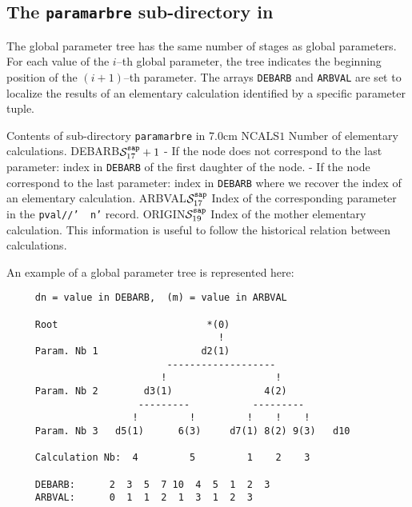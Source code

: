 \subsection{The {\tt paramarbre} sub-directory in }\label{sect:sapdirarbre}

The global parameter tree has the same number of stages as global parameters. For each value of
the $i$--th global parameter, the tree indicates the beginning position of the $(i+1)$--th parameter.
The arrays {\tt DEBARB} and {\tt ARBVAL} are set to localize the results of an elementary calculation
identified by a specific parameter tuple.

\begin{DescriptionEnregistrement}{Contents of sub-directory {\tt paramarbre} in }{7.0cm}
\label{tabl:tabtree}
\IntEnr
  {NCALS}{$1$}
  {Number of elementary calculations.}
\IntEnr
  {DEBARB}{$\mathcal{S}^{\tt sap}_{17}+1$}
  {- If the node does not correspond to the last parameter:
     index in {\tt DEBARB} of the first daughter of the node.
   - If the node correspond to the last parameter: index in
     {\tt DEBARB} where we recover the index of an elementary
     calculation.}
\IntEnr
  {ARBVAL}{$\mathcal{S}^{\tt sap}_{17}$}
  {Index of the corresponding parameter in the {\tt pval//'~~n'} record.}
\IntEnr
  {ORIGIN}{$\mathcal{S}^{\tt sap}_{19}$}
  {Index of the mother elementary calculation. This information is useful to follow the
  historical relation between calculations.}
\end{DescriptionEnregistrement}

An example of a global parameter tree is represented here:
\begin{verbatim}
     dn = value in DEBARB,  (m) = value in ARBVAL

     Root                          *(0)
                                     !
     Param. Nb 1                  d2(1)
                            -------------------
                           !                   !
     Param. Nb 2        d3(1)                4(2)
                       ---------           ---------
                      !         !         !    !    !
     Param. Nb 3   d5(1)      6(3)     d7(1) 8(2) 9(3)   d10

     Calculation Nb:  4         5         1    2    3

     DEBARB:      2  3  5  7 10  4  5  1  2  3
     ARBVAL:      0  1  1  2  1  3  1  2  3
\end{verbatim}


